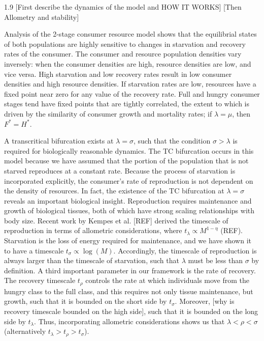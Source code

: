 \documentclass[12pt,english]{article}
\begin{document}
\begin{spacing}{1.9}
[First describe the dynamics of the model and HOW IT WORKS]
[Then Allometry and stability]

Analysis of the 2-stage consumer resource model shows that the equilibrial states of both populations are highly sensitive to changes in  starvation and recovery rates of the consumer.
The consumer and resource population densities vary inversely: when the consumer densities are high, resource densities are low, and vice versa.
High starvation and low recovery rates result in low consumer densities and high resource densities. %
If starvation rates are low, resources have a fixed point near zero for any value of the recovery rate.
Full and hungry consumer stages tend have fixed points that are tightly correlated, the extent to which is driven by the similarity of consumer growth and mortality rates; if $\lambda = \mu$, then $F^* = H^*$.

A transcritical bifurcation exists at $\lambda = \sigma$, such that the condition $\sigma > \lambda$ is required for biologically reasonable dynamics.
The TC bifurcation occurs in this model because we have assumed that the portion of the population that is not starved reproduces at a constant rate.
Because the process of starvation is incorporated explicitly, the consumer's rate of reproduction is not dependent on the density of resources.
In fact, the existence of the TC bifurcation at $\lambda = \sigma$ reveals an important biological insight. 
Reproduction requires maintenance and growth of biological tissues, both of which have strong scaling relationships with body size.
Recent work by Kempes et al. [REF] derived the timescale of reproduction in terms of allometric considerations, where $t_\lambda \propto M^{1-\eta}$ (REF).
Starvation is the loss of energy required for maintenance, and we have shown it to have a timescale $t_\sigma \propto \log(M)$.
Accordingly, the timescale of reproduction is always larger than the timescale of starvation, such that $\lambda$ must be less than $\sigma$ by definition.
A third important parameter in our framework is the rate of recovery.
The recovery timescale $t_\rho$ controls the rate at which individuals move from the hungry class to the full class, and this requires not only tissue maintenance, but growth, such that it is bounded on the short side by $t_\sigma$.
Moreover, [why is recovery timescale bounded on the high side], such that it is bounded on the long side by $t_\lambda$.
Thus, incorporating allometric considerations shows us that $\lambda < \rho < \sigma$ (alternatively $t_\lambda > t_\rho > t_\sigma$).


\end{spacing}
\end{document}
